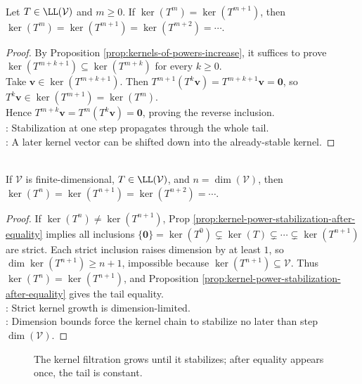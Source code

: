 \begin{proposition} \label{prop:kernel-power-stabilization-after-equality} \\
Let $T\in\LL(\mathcal{V})$ and $m\geq0$. If $\ker(T^m)=\ker(T^{m+1})$, then $\ker(T^m)=\ker(T^{m+1})=\ker(T^{m+2})=\cdots$.
\begin{proof}
By Proposition \ref{prop:kernels-of-powers-increase}, it suffices to prove $\ker(T^{m+k+1})\subseteq\ker(T^{m+k})$ for every $k\geq0$.\\
Take $\mathbf{v}\in\ker(T^{m+k+1})$. Then $T^{m+1}(T^k\mathbf{v})=T^{m+k+1}\mathbf{v}=\mathbf{0}$, so $T^k\mathbf{v}\in\ker(T^{m+1})=\ker(T^m)$.\\
Hence $T^{m+k}\mathbf{v}=T^m(T^k\mathbf{v})=\mathbf{0}$, proving the reverse inclusion.\\
: Stabilization at one step propagates through the whole tail.\\
: A later kernel vector can be shifted down into the already-stable kernel.
\end{proof}
\end{proposition}

\begin{theorem} \label{thm:kernel-powers-stabilize-by-dimension} \\
If $\mathcal{V}$ is finite-dimensional, $T\in\LL(\mathcal{V})$, and $n=\dim(\mathcal{V})$, then $\ker(T^n)=\ker(T^{n+1})=\ker(T^{n+2})=\cdots$.
\begin{proof}
If $\ker(T^n)\neq\ker(T^{n+1})$, Prop \ref{prop:kernel-power-stabilization-after-equality} implies all inclusions $\{\mathbf{0}\}=\ker(T^0)\subsetneq\ker(T)\subsetneq\cdots\subsetneq\ker(T^{n+1})$
are strict. Each strict inclusion raises dimension by at least $1$, so $\dim\ker(T^{n+1})\geq n+1$, impossible because $\ker(T^{n+1})\subseteq\mathcal{V}$. Thus $\ker(T^n)=\ker(T^{n+1})$, and Proposition \ref{prop:kernel-power-stabilization-after-equality} gives the tail equality.\\
: Strict kernel growth is dimension-limited.\\
: Dimension bounds force the kernel chain to stabilize no later than step $\dim(\mathcal{V})$.
\end{proof}
\end{theorem}

\begin{figure}[H]
  \centering
  
  \caption{The kernel filtration grows until it stabilizes; after equality appears once, the tail is constant.}
  \label{fig:kernel-power-filtration}
\end{figure}

